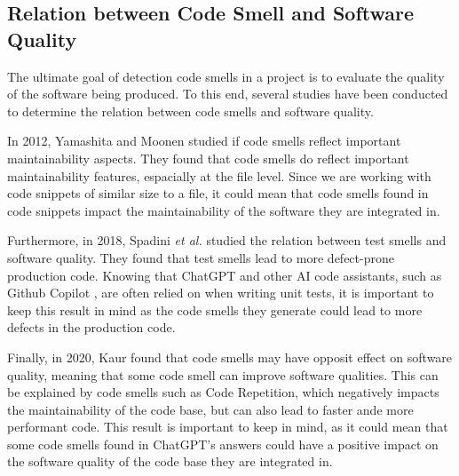 \subsection{Relation between Code Smell and Software Quality}
\label{sec:related-work-relation-between-code-smell-and-software-quality}
The ultimate goal of detection code smells in a project is to evaluate the quality of the software being produced. To this end, several studies have been conducted to determine the relation between code smells and software quality.

In 2012, Yamashita and Moonen \cite{yamashita-2012} studied if code smells reflect important maintainability aspects. They found that code smells do reflect important maintainability features, espacially at the file level. Since we are working with code snippets of similar size to a file, it could mean that code smells found in code snippets impact the maintainability of the software they are integrated in.

Furthermore, in 2018, Spadini \textit{et al.} \cite{spadini-2018} studied the relation between test smells and software quality. They found that test smells lead to more defect-prone production code. Knowing that ChatGPT and other AI code assistants, such as Github Copilot \cite{github-copilot}, are often relied on when writing unit tests, it is important to keep this result in mind as the code smells they generate could lead to more defects in the production code.

Finally, in 2020, Kaur \cite{kaur-2020} found that code smells may have opposit effect on software quality, meaning that some code smell can improve software qualities. This can be explained by code smells such as Code Repetition, which negatively impacts the maintainability of the code base, but can also lead to faster ande more performant code. This result is important to keep in mind, as it could mean that some code smells found in ChatGPT's answers could have a positive impact on the software quality of the code base they are integrated in.